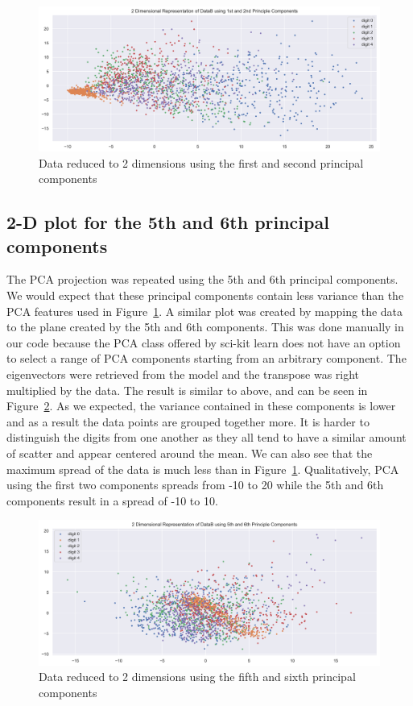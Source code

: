 \begin{figure}[htb]
 \centering
\includegraphics[width=\textwidth]{assignment1/2-2-dimreduction_pca1_2.png}
\caption{\label{fig:fig3}Data reduced to 2 dimensions using the first and second principal components}
\end{figure}


\clearpage{}
\subsection{2-D plot for the 5th and 6th principal components}

The PCA projection was repeated using the 5th and 6th principal components. We would expect that these principal components contain less variance than the PCA features used in Figure~\ref{fig:fig3}. A similar plot was created by mapping the data to the plane created by the 5th and 6th components. This was done manually in our code because the PCA class offered by sci-kit learn does not have an option to select a range of PCA components starting from an arbitrary component. The eigenvectors were retrieved from the model and the transpose was right multiplied by the data. The result is similar to above, and can be seen in Figure~\ref{fig:fig4}. As we expected, the variance contained in these components is lower and as a result the data points are grouped together more. It is harder to distinguish the digits from one another as they all tend to have a similar amount of scatter and appear centered around the mean. We can also see that the maximum spread of the data is much less than in Figure~\ref{fig:fig3}. Qualitatively, PCA using the first two components spreads from -10 to 20 while the 5th and 6th components result in a spread of -10 to 10.

\begin{figure}[htb]
 \centering
\includegraphics[width=\textwidth]{assignment1/2-3-dimreduction_pca5_6.png}
\caption{\label{fig:fig4}Data reduced to 2 dimensions using the fifth and sixth principal components}
\end{figure}



